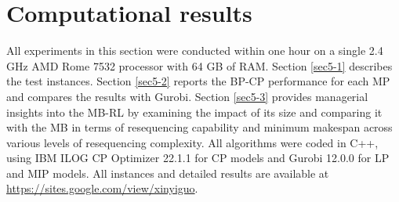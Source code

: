 \documentclass[12pt]{article}
\begin{document}
\section{Computational results}\label{sec5}
All experiments in this section were conducted within one hour on a single 2.4 GHz AMD Rome 7532 processor with 64 GB of RAM. Section \ref{sec5-1} describes the test instances. Section \ref{sec5-2} reports the BP-CP performance for each MP and compares the results with Gurobi. Section \ref{sec5-3} provides managerial insights into the MB-RL by examining the impact of its size and comparing it with the MB in terms of resequencing capability and minimum makespan across various levels of resequencing complexity. All algorithms were coded in C++, using IBM ILOG CP Optimizer 22.1.1 for CP models and Gurobi 12.0.0 for LP and MIP models. All instances and detailed results are available at \href{https://sites.google.com/view/xinyiguo}{https://sites.google.com/view/xinyiguo}.


\end{document}
